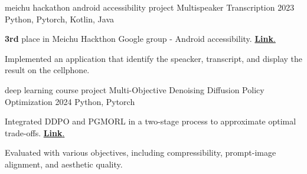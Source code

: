 

\begin{cventries}
    
  
    

  \cventry
      {meichu hackathon android accessibility project} 
      {Multispeaker Transcription} 
      {2023} 
      {Python, Pytorch, Kotlin, Java}
      {
        \begin{cvitems} %
          \item {\textbf{3rd} place in Meichu Hackthon Google group - Android accessibility. \href{https://github.com/stanleyshen2003/multispeaker_transcription}{\textbf{Link}.}}
          \item {Implemented an application that identify the speacker, transcript, and display the result on the cellphone.}
        \end{cvitems}
      }

    \cventry
      {deep learning course project} 
      {Multi-Objective Denoising Diffusion Policy Optimization} 
      {2024} 
      {Python, Pytorch}
      {
        \begin{cvitems} %
          \item {Integrated DDPO and PGMORL in a two-stage process to approximate optimal trade-offs. \href{https://github.com/KJLdefeated/MODDPO}{\textbf{Link}.}}
          \item {Evaluated with various objectives, including compressibility, prompt-image alignment, and aesthetic quality. }
        \end{cvitems}
      }


\end{cventries}
